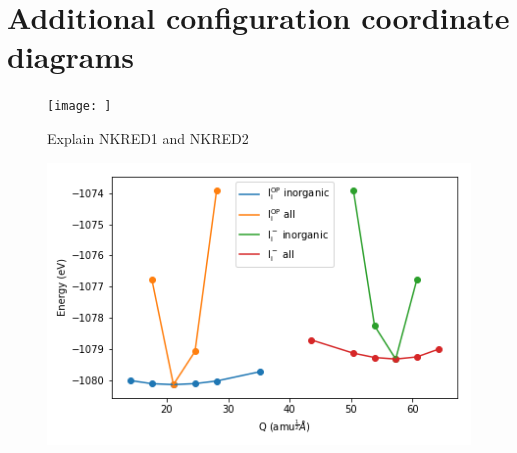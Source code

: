 \chapter{\label{app:9-configcoord}Additional configuration coordinate diagrams}

\begin{figure}[h!]   %
\centering
  \texttt{[image: ]}
  \caption[]{Explain NKRED1 and NKRED2}
\label{schrodinger}
\end{figure}


\begin{figure}[h!]   %
\centering
  \includegraphics[width=0.7\columnwidth]{figures/ap9/organic_inorganic.png}
  \caption[]{}
\label{schrodinger}
\end{figure}
